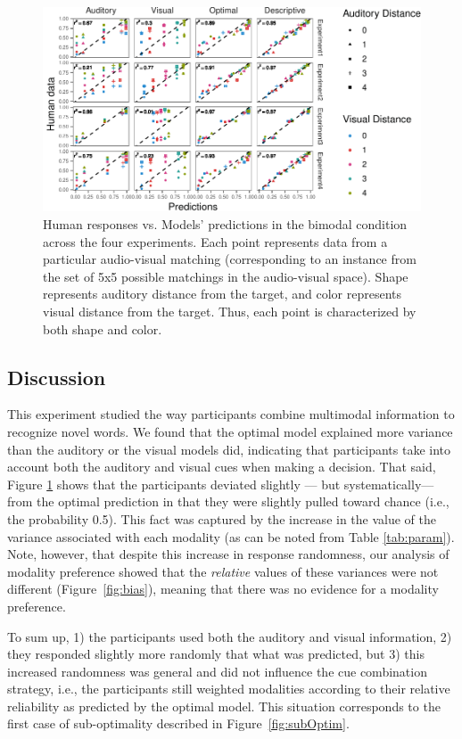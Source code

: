 \documentclass[english,,man,floatsintext]{apa6}
\theoremstyle{definition}
\theoremstyle{definition}
\theoremstyle{definition}
\theoremstyle{remark}
\begin{document}
\begin{figure}[!h]
\includegraphics[width=\textwidth]{ms_r2_files/figure-latex/bimodal-1} \caption{Human responses vs. Models' predictions in the bimodal condition across the four experiments. Each point represents data from a particular audio-visual matching (corresponding to an instance from the set of 5x5 possible matchings in the audio-visual space). Shape represents auditory distance from the target, and color represents visual distance from the target. Thus, each point is characterized by both  shape and color.}\label{fig:bimodal}
\end{figure}

\subsection{Discussion}\label{discussion}

This experiment studied the way participants combine multimodal
information to recognize novel words. We found that the optimal model
explained more variance than the auditory or the visual models did,
indicating that participants take into account both the auditory and
visual cues when making a decision. That said, Figure \ref{fig:bimodal}
shows that the participants deviated slightly --- but systematically---
from the optimal prediction in that they were slightly pulled toward
chance (i.e., the probability 0.5). This fact was captured by the
increase in the value of the variance associated with each modality (as
can be noted from Table \ref{tab:param}). Note, however, that despite
this increase in response randomness, our analysis of modality
preference showed that the \emph{relative} values of these variances
were not different (Figure~\ref{fig:bias}), meaning that there was no
evidence for a modality preference.

To sum up, 1) the participants used both the auditory and visual
information, 2) they responded slightly more randomly that what was
predicted, but 3) this increased randomness was general and did not
influence the cue combination strategy, i.e., the participants still
weighted modalities according to their relative reliability as predicted
by the optimal model. This situation corresponds to the first case of
sub-optimality described in Figure~\ref{fig:subOptim}.
\end{document}
